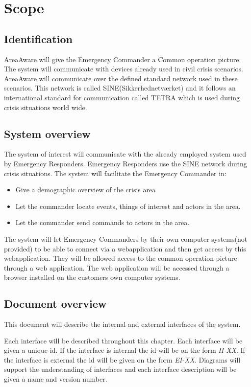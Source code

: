 \label{chp_scope}
\chapter{Scope}

\section{Identification}

AreaAware will give the Emergency Commander a Common operation picture. The system will communicate with devices already used in civil crisis scenarios. AreaAware will communicate over the defined standard network used in these scenarios. This
network is called SINE(Sikkerhednetværket) and it follows an international standard for communication called TETRA which is used during crisis situations world wide.

\section{System overview}
The system of interest will communicate with the already employed system used by Emergency Responders. Emergency Responders use the SINE network during crisis situations. The system will facilitate the Emergency Commander in:

\begin{itemize}
	\item  Give a demographic overview of the crisis area
	\item Let the commander locate events, things of interest and actors in the area.
	\item Let the commander send commands to actors in the area.
\end{itemize}

The system will let Emergency Commanders by their own computer systems(not provided) to be able to connect via a webapplication and then get access by this webapplication. They will be allowed access to the common operation picture through a web application. The web application will be accessed through a browser installed on the customers own computer systems.


\section{Document overview}
This document will describe the internal and external interfaces of the system.

Each interface will be described throughout this chapter. Each interface will be given a unique id. If the interface is internal the id will be on the form \emph{II-XX}. If the interface is external the id will be given on the form \emph{EI-XX}. Diagrams will support the understanding of interfaces and each interface description will be given a name and version number.

